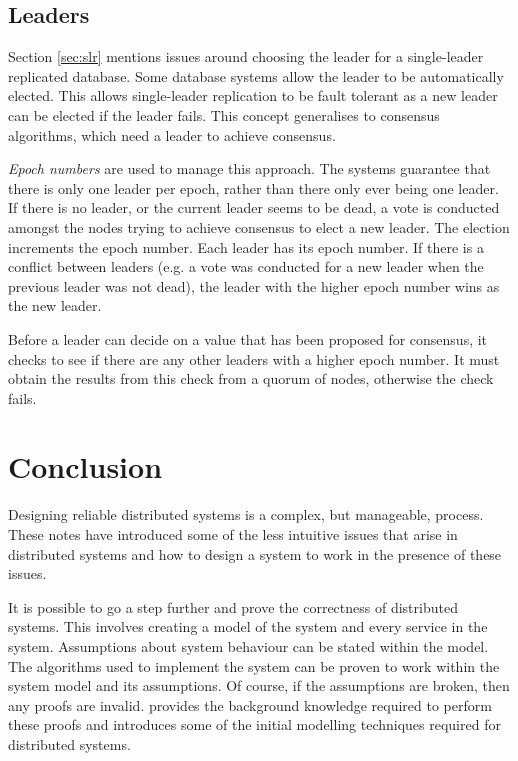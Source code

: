 \subsection{Leaders}

Section \ref{sec:slr} mentions issues around choosing the leader for a single-leader replicated database.
Some database systems allow the leader to be automatically elected.
This allows single-leader replication to be fault tolerant as a new leader can be elected if the leader fails.
This concept generalises to consensus algorithms, which need a leader to achieve consensus.

\emph{Epoch numbers} are used to manage this approach.
The systems guarantee that there is only one leader per epoch, rather than there only ever being one leader.
If there is no leader, or the current leader seems to be dead,
a vote is conducted amongst the nodes trying to achieve consensus to elect a new leader.
The election increments the epoch number.
Each leader has its epoch number.
If there is a conflict between leaders (e.g. a vote was conducted for a new leader when the previous leader was not dead),
the leader with the higher epoch number wins as the new leader.

Before a leader can decide on a value that has been proposed for consensus,
it checks to see if there are any other leaders with a higher epoch number.
It must obtain the results from this check from a quorum of nodes,
otherwise the check fails.


\section{Conclusion}

Designing reliable distributed systems is a complex, but manageable, process.
These notes have introduced some of the less intuitive issues that arise in distributed systems
and how to design a system to work in the presence of these issues.

It is possible to go a step further and prove the correctness of distributed systems.
This involves creating a model of the system and every service in the system.
Assumptions about system behaviour can be stated within the model.
The algorithms used to implement the system can be proven to work within the system model and its assumptions.
Of course, if the assumptions are broken, then any proofs are invalid.
provides the background knowledge required to perform these proofs
and introduces some of the initial modelling techniques required for distributed systems.
